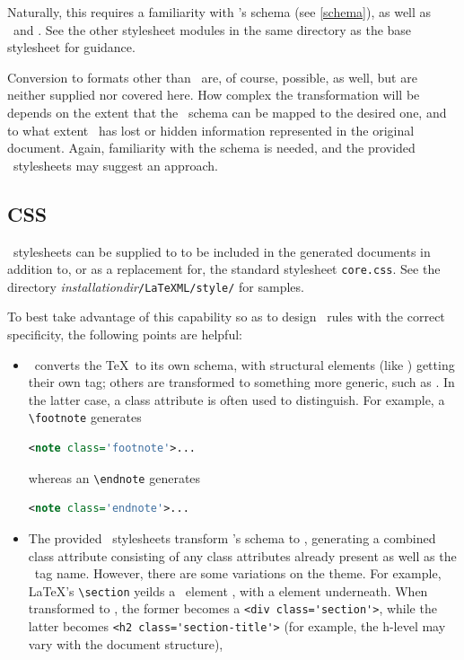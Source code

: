 \documentclass{book}
\begin{document}
Naturally, this requires a familiarity with \LaTeXML's schema (see \ref{schema}),
as well as \XSLT\ and \XHTML.  See the other stylesheet modules in the same directory
as the base stylesheet for guidance.

Conversion to formats other than \XHTML\ are, of course, possible, as well,
but are neither supplied nor covered here.
How complex the transformation will be depends on the extent
that the \LaTeXML\ schema can be mapped to the desired one,
and to what extent \LaTeXML\ has lost or hidden information
represented in the original document.  Again, familiarity with the schema is needed,
and the provided \XHTML\ stylesheets may suggest an approach.

\subsection{CSS}\label{customization.latexmlpost.css}
\CSS\ stylesheets can be supplied to  to
be included in the generated documents in addition to, or as a
replacement for, the standard stylesheet \texttt{core.css}.
See the directory
\textit{installationdir}\texttt{/LaTeXML/style/}
for samples.

To best take advantage of this capability so as to design
\CSS\ rules with the correct specificity, the following points are helpful:
\begin{itemize}
\item \LaTeXML\ converts the \TeX\ to its own schema,
  with structural elements (like ) getting their own tag;
  others are transformed to something more generic, such as .
  In the latter case, a class attribute is often used to distinguish.
  For example, a \verb|\footnote| generates
\begin{lstlisting}[language=xml]
  <note class='footnote'>...
\end{lstlisting}
  whereas an \verb|\endnote| generates
\begin{lstlisting}[language=xml]
  <note class='endnote'>...
\end{lstlisting}
\item The provided \XSLT\ stylesheets transform \LaTeXML's schema to \XHTML,
  generating a combined class attribute consisting of any class attributes
  already present as well as the \LaTeXML\ tag name.
  However, there are some variations on the theme.
  For example, \LaTeX's \verb|\section| yeilds a \LaTeXML\ element ,
  with a  element underneath.  When transformed to
  \XHTML, the former becomes a \verb|<div class='section'>|,
  while the latter becomes \verb|<h2 class='section-title'>|
 (for example, the h-level may vary with the document structure),
\end{itemize}
\end{document}
